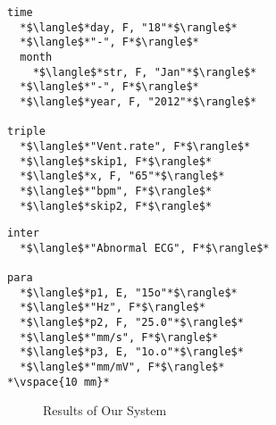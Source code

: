 %
%
%
%

\newsavebox{\prflisting}
\begin{lrbox}{\prflisting}%
\begin{lstlisting}
time
  *$\langle$*day, F, "18"*$\rangle$*
  *$\langle$*"-", F*$\rangle$*
  month
    *$\langle$*str, F, "Jan"*$\rangle$*
  *$\langle$*"-", F*$\rangle$*
  *$\langle$*year, F, "2012"*$\rangle$*

triple
  *$\langle$*"Vent.rate", F*$\rangle$*
  *$\langle$*skip1, F*$\rangle$*
  *$\langle$*x, F, "65"*$\rangle$*
  *$\langle$*"bpm", F*$\rangle$*
  *$\langle$*skip2, F*$\rangle$*
\end{lstlisting}
\end{lrbox}

\newsavebox{\prslisting}
\begin{lrbox}{\prslisting}%
\begin{lstlisting}
inter
  *$\langle$*"Abnormal ECG", F*$\rangle$*

para
  *$\langle$*p1, E, "15o"*$\rangle$*
  *$\langle$*"Hz", F*$\rangle$*
  *$\langle$*p2, F, "25.0"*$\rangle$*
  *$\langle$*"mm/s", F*$\rangle$*
  *$\langle$*p3, E, "1o.o"*$\rangle$*
  *$\langle$*"mm/mV", F*$\rangle$*
*\vspace{10 mm}*
\end{lstlisting}
\end{lrbox}

\begin{figure}[th]
\small
\subfloat{
\scalebox{1}{\usebox{\prflisting}}} 
\hspace{7 mm}
\subfloat{
\scalebox{1}{\usebox{\prslisting}}}
\caption{Results of Our System}
\label{fig:parseresult}
\end{figure}

